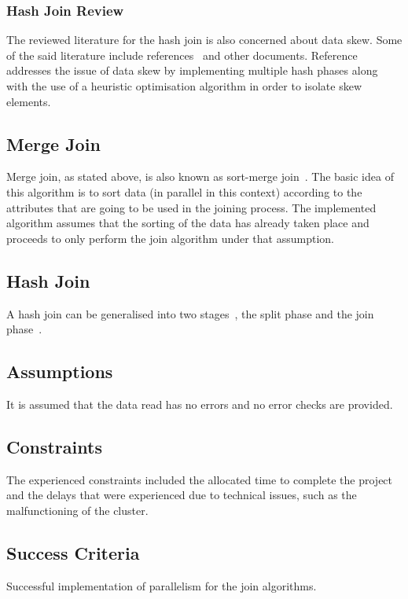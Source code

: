 \documentclass[conference, 11pt]{IEEEtran}
\begin{document}
	\subsubsection{Hash Join Review}
	The reviewed literature for the hash join is also concerned about data skew. Some of the said literature include references~\cite{dias,roy} and other documents. Reference~\cite{dias} addresses the issue of data skew by implementing multiple hash phases along with the use of a heuristic optimisation algorithm in order to isolate skew elements\cite{dias}. 
	
	
	\subsection{Merge Join}
	Merge join, as stated above, is also known as sort-merge join~\cite{goetz}. The basic idea of this algorithm is to sort data (in parallel in this context) according to the attributes that are going to be used in the joining process\cite{heap}. The implemented algorithm assumes that the sorting of the data has already taken place and proceeds to only perform the join algorithm under that assumption.
	
	\subsection{Hash Join}
	A hash join can be generalised into two stages~\cite{roy}, the split phase and the join phase~\cite{masaru}.
	
	
	
	\subsection{Assumptions}
	It is assumed that the data read has no errors and no error checks are provided.
	
	\subsection{Constraints}
	The experienced constraints included the allocated time to complete the project and the delays that were experienced due to technical issues, such as the malfunctioning of the cluster.
	
	\subsection{Success Criteria}
	Successful implementation of parallelism for the join algorithms.
	
\end{document}
